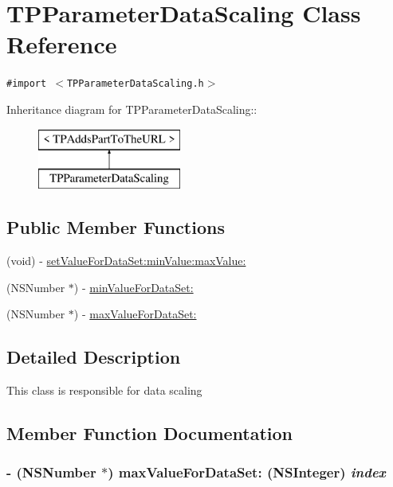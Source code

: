 \hypertarget{interface_t_p_parameter_data_scaling}{
\section{TPParameterDataScaling Class Reference}
\label{interface_t_p_parameter_data_scaling}
}
{\tt \#import $<$TPParameterDataScaling.h$>$}

Inheritance diagram for TPParameterDataScaling::\begin{figure}[H]
\begin{center}
\leavevmode
\includegraphics[height=2cm]{interface_t_p_parameter_data_scaling}
\end{center}
\end{figure}
\subsection*{Public Member Functions}
\begin{CompactItemize}
\item 
(void) - \hyperlink{interface_t_p_parameter_data_scaling_3dfe9bc7aed1db751668d2b35ed5f96a}{setValueForDataSet:minValue:maxValue:}
\item 
(NSNumber $\ast$) - \hyperlink{interface_t_p_parameter_data_scaling_5a9973137a688517df307f31c3a0897f}{minValueForDataSet:}
\item 
(NSNumber $\ast$) - \hyperlink{interface_t_p_parameter_data_scaling_ba2b88c8204e29d01147545b935e5af1}{maxValueForDataSet:}
\end{CompactItemize}


\subsection{Detailed Description}
This class is responsible for data scaling 

\subsection{Member Function Documentation}
\hypertarget{interface_t_p_parameter_data_scaling_ba2b88c8204e29d01147545b935e5af1}{
\subsubsection[{maxValueForDataSet:}]{\setlength{\rightskip}{0pt plus 5cm}- (NSNumber $\ast$) maxValueForDataSet: (NSInteger) {\em index}}}
\label{interface_t_p_parameter_data_scaling_ba2b88c8204e29d01147545b935e5af1}


